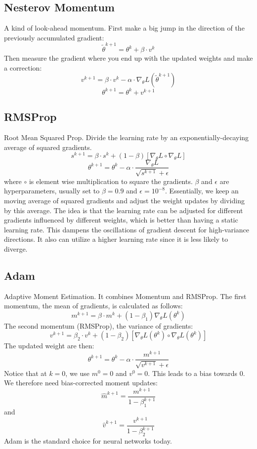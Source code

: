 \documentclass{scrartcl}
\begin{document}
\subsection*{Nesterov Momentum}
A kind of look-ahead momentum.
First make a big jump in the direction of the previously accumulated gradient:
$$\widetilde{\theta}^{k+1} = \theta^k + \beta \cdot v^k$$
Then measure the gradient where you end up with the updated weights and make a correction:
$$v^{k+1} = \beta \cdot v^k - \alpha \cdot \nabla_\theta L(\widetilde{\theta}^{k+1})$$
$$\theta^{k+1} = \theta^k + v^{k+1}$$

\subsection*{RMSProp}
Root Mean Squared Prop.
Divide the learning rate by an exponentially-decaying average of squared gradients.
$$s^{k+1} = \beta \cdot s^k + (1-\beta)[\nabla_\theta L \circ \nabla_\theta L]$$
$$\theta^{k+1} = \theta^k - \alpha \cdot \frac{\nabla_\theta L}{\sqrt{s^{k+1}} + \epsilon}$$
where $\circ$ is element wise multiplication to square the gradients. $\beta$ and $\epsilon$ are hyperparameters, usually set to $\beta = 0.9$ and $\epsilon = 10^{-8}$.
Essentially, we keep an moving average of squared gradients and adjust the weight updates by dividing by this average. The idea is that the learning rate can be adjusted for different gradients influenced by different weights, which is better than having a static learning rate.
This dampens the oscillations of gradient descent for high-variance directions.
It also can utilize a higher learning rate since it is less likely to diverge.

\subsection*{Adam}
Adaptive Moment Estimation.
It combines Momentum and RMSProp.
The first momentum, the mean of gradients, is calculated as follows:
$$m^{k+1} = \beta \cdot m^k + (1 - \beta_1) \nabla_\theta L(\theta^k)$$
The second momentum (RMSProp), the variance of gradients:
$$v^{k+1} = \beta_2 \cdot v^k + (1-\beta_2)[\nabla_\theta L(\theta^k) \circ \nabla_\theta L(\theta^k)]$$
The updated weight are then:
$$\theta^{k+1} = \theta^k - \alpha \cdot \frac{m^{k+1}}{\sqrt{v^{k+1}} + \epsilon}$$
Notice that at $k = 0$, we use $m^0 = 0$ and $v^0 = 0$. This leads to a bias towards 0. We therefore need bias-corrected moment updates:
$$\hat{m}^{k+1} = \frac{m^{k+1}}{1 - \beta_1^{k+1}}$$
and
$$\hat{v}^{k+1} = \frac{v^{k+1}}{1 - \beta_2^{k+1}}$$
Adam is the standard choice for neural networks today.
\end{document}
